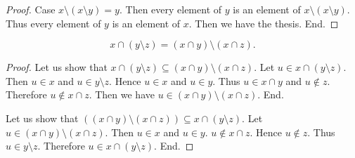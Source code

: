 \documentclass[../../set-theory.ftl.tex]{subfiles}
\begin{document}
\begin{forthel}
\begin{proof}
      Case $x \setminus (x \setminus y) = y$.
        Then every element of $y$ is an element of $x \setminus
        (x \setminus y)$.
        Thus every element of $y$ is an element of $x$.
        Then we have the thesis.
      End.
    \end{proof}

    \begin{proposition}\label{SetTheory_01_01_878796}
      \[ x \cap (y \setminus z) = (x \cap y) \setminus (x \cap z). \]
    \end{proposition}
    \begin{proof}
      Let us show that $x \cap (y \setminus z) \subseteq (x \cap y) \setminus (x \cap z)$.
        Let $u \in x \cap (y \setminus z)$.
        Then $u \in x$ and $u \in y \setminus z$.
        Hence $u \in x$ and $u \in y$.
        Thus $u \in x \cap y$ and $u \notin z$.
        Therefore $u \notin x \cap z$.
        Then we have $u \in (x \cap y) \setminus (x \cap z)$.
      End.

      Let us show that $((x \cap y) \setminus (x \cap z)) \subseteq x \cap (y \setminus z)$.
        Let $u \in (x \cap y) \setminus (x \cap z)$.
        Then $u \in x$ and $u \in y$.
        $u \notin x \cap z$.
        Hence $u \notin z$.
        Thus $u \in y \setminus z$.
        Therefore $u \in x \cap (y \setminus z)$.
      End.
    \end{proof}
  \end{forthel}
\end{document}
